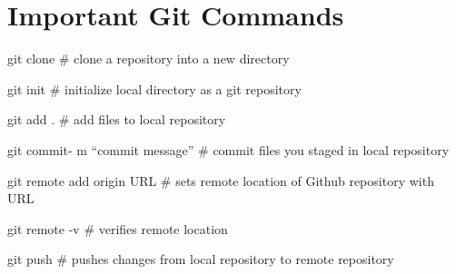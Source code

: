 \documentclass[]{book}
\newenvironment{Shaded}{\begin{snugshade}}{\end{snugshade}}
\newcommand{\FunctionTok}[1]{\textcolor[rgb]{0.00,0.00,0.00}{#1}}
\newcommand{\NormalTok}[1]{#1}
\begin{document}
\section{Important Git Commands}\label{important-git-commands}

\begin{Shaded}
\begin{Highlighting}[]
\FunctionTok{git}\NormalTok{ clone                       # clone a repository into a new directory}
\end{Highlighting}
\end{Shaded}

\begin{Shaded}
\begin{Highlighting}[]
\FunctionTok{git}\NormalTok{ init                        # initialize local directory as a git repository}
\end{Highlighting}
\end{Shaded}

\begin{Shaded}
\begin{Highlighting}[]
\FunctionTok{git}\NormalTok{ add .                       # add files to local repository}
\end{Highlighting}
\end{Shaded}

\begin{Shaded}
\begin{Highlighting}[]
\FunctionTok{git}\NormalTok{ commit- m “commit message”  # commit files you staged in local repository}
\end{Highlighting}
\end{Shaded}

\begin{Shaded}
\begin{Highlighting}[]
\FunctionTok{git}\NormalTok{ remote add origin URL           # sets remote location of Github repository with URL}
\end{Highlighting}
\end{Shaded}

\begin{Shaded}
\begin{Highlighting}[]
\FunctionTok{git}\NormalTok{ remote -v                         # verifies remote location}
\end{Highlighting}
\end{Shaded}

\begin{Shaded}
\begin{Highlighting}[]
\FunctionTok{git}\NormalTok{ push                                  # pushes changes from local repository to remote repository }
\end{Highlighting}
\end{Shaded}
\end{document}
